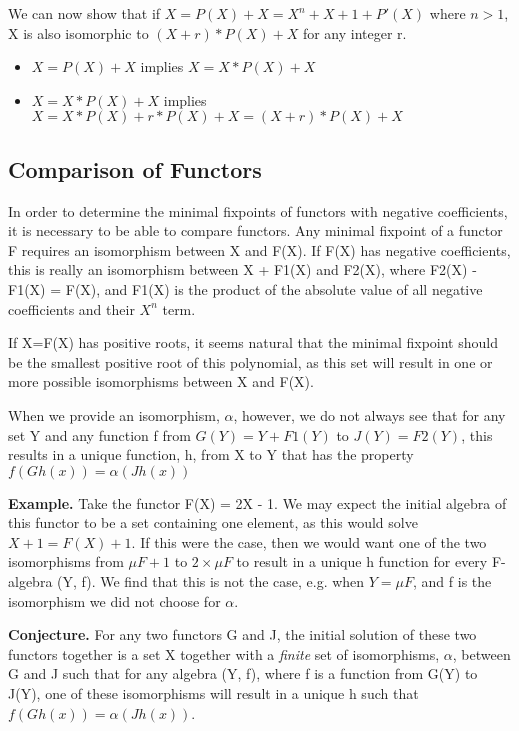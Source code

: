 \documentclass[letterpaper,numbers=enddot]{scrartcl}
\begin{document}
We can now show that if $X=P(X) + X = X^n + X + 1 + P'(X)$ where $n > 1$, X is also isomorphic to $(X + r)*P(X) + X$ for any integer r.

\begin{itemize}
  \item $X = P(X) + X$ implies $X = X*P(X) + X$
  \item $X = X*P(X) + X$ implies $X = X*P(X) + r*P(X) + X = (X + r)*P(X) + X$
\end{itemize}

\subsection{Comparison of Functors}

In order to determine the minimal fixpoints of functors with negative coefficients, it is necessary to be able to compare functors.  Any minimal fixpoint of a functor F requires an isomorphism between X and F(X).  If F(X) has negative coefficients, this is really an isomorphism between X + F1(X) and F2(X), where F2(X) - F1(X) = F(X), and F1(X) is the product of the absolute value of all negative coefficients and their $X^n$ term.

If X=F(X) has positive roots, it seems natural that the minimal fixpoint should be the smallest positive root of this polynomial, as this set will result in one or more possible isomorphisms between X and F(X).

When we provide an isomorphism, $\alpha$, however, we do not always see that for any set Y and any function f from $G(Y)=Y+F1(Y)$ to $J(Y)=F2(Y)$, this results in a unique function, h, from X to Y that has the property $f(Gh(x)) = \alpha (Jh(x))$

\textbf{Example. }
  Take the functor F(X) = 2X - 1.  We may expect the initial algebra of this functor to be a set containing one element, as this would solve $X + 1=F(X) + 1$.  If this were the case, then we would want one of the two isomorphisms from $\mu F + 1$ to $2 \times \mu F$ to result in a unique h function for every F-algebra (Y, f).  We find that this is not the case, e.g. when $Y = \mu F$, and f is the isomorphism we did not choose for $\alpha$.

\textbf{Conjecture. }
  For any two functors G and J, the initial solution of these two functors together is a set X together with a \emph{finite} set of isomorphisms, $\alpha$, between G and J such that for any algebra (Y, f), where f is a function from G(Y) to J(Y), one of these isomorphisms will result in a unique h such that $f(Gh(x)) = \alpha (Jh(x))$.
\end{document}
